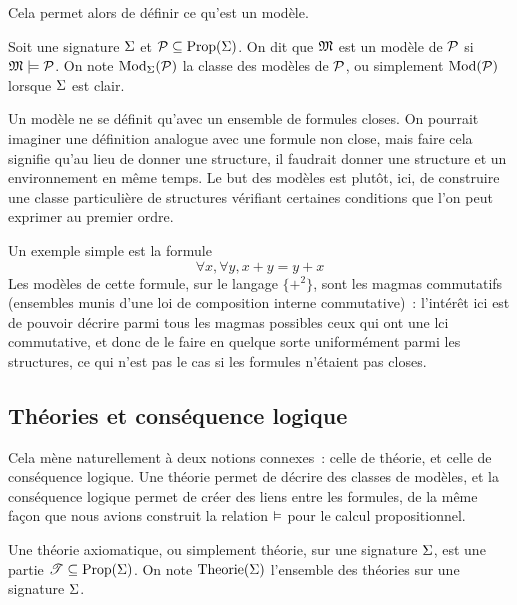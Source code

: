 \noindent
Cela permet alors de définir ce qu'est un modèle.

\begin{definition}[Modèle]
  Soit une signature $\Sigma$ et $\mathcal P\subseteq\operatorname{Prop}(\Sigma)$. On dit que
  $\mathfrak{M}$ est un modèle de $\mathcal P$ si $\mathfrak{M}\models \mathcal P$. On note
  $\operatorname{Mod}_{\Sigma}(\mathcal P)$ la classe des modèles de $\mathcal P$, ou simplement
  $\operatorname{Mod}(\mathcal P)$ lorsque $\Sigma$ est clair.
\end{definition}

Un modèle ne se définit qu'avec un ensemble de formules closes. On pourrait
imaginer une définition analogue avec une formule non close, mais faire cela
signifie qu'au lieu de donner une structure, il faudrait donner une structure et
un environnement en même temps. Le but des modèles est plutôt, ici, de
construire une classe particulière de structures vérifiant certaines conditions
que l'on peut exprimer au premier ordre.

Un exemple simple est la formule
\[\forall x,\forall y, x + y = y + x\]
Les modèles de cette formule, sur le langage $\{+^2\}$, sont les magmas
commutatifs (ensembles munis d'une loi de composition interne commutative)~:
l'intérêt ici est de pouvoir décrire parmi tous les magmas possibles ceux qui
ont une lci commutative, et donc de le faire en quelque sorte uniformément parmi
les structures, ce qui n'est pas le cas si les formules n'étaient pas closes.

\subsection{Théories et conséquence logique}\label{subsec.theorie}

Cela mène naturellement à deux notions connexes~: celle de théorie, et celle
de conséquence logique. Une théorie permet de décrire des classes de modèles, et
la conséquence logique permet de créer des liens entre les formules, de la même
façon que nous avions construit la relation $\vDash$ pour le calcul propositionnel.

\begin{definition}[Théorie]
  Une théorie axiomatique, ou simplement théorie, sur une signature $\Sigma$,
  est une partie $\mathscr T\subseteq\operatorname{Prop}(\Sigma)$. On note $\operatorname{Theorie}(\Sigma)$
  l'ensemble des théories sur une signature $\Sigma$.
\end{definition}

